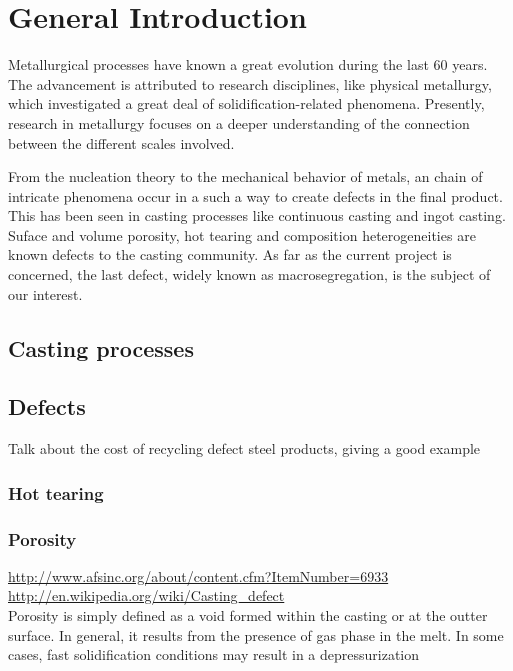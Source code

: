 \chapter*{General Introduction}


Metallurgical processes have known a great evolution during the last 60 years. The advancement is attributed to 
research disciplines, like physical metallurgy, which investigated a great deal of solidification-related phenomena.
Presently, research in metallurgy focuses on a deeper understanding of the connection between the different scales involved.

From the nucleation theory to the mechanical behavior of metals, an chain of intricate phenomena occur in a such a way
to create defects in the final product. This has been seen in casting processes like continuous casting and ingot
casting. Suface and volume porosity, hot tearing and composition heterogeneities are known defects to the casting community.
As far as the current project is concerned, the last defect, widely known as macrosegregation, is the subject of our interest.

\section{Casting processes}

\section*{Defects}
Talk about the cost of recycling defect steel products, giving a good example
\subsection*{Hot tearing}

\subsection*{Porosity}
\url{http://www.afsinc.org/about/content.cfm?ItemNumber=6933} \\
\url{http://en.wikipedia.org/wiki/Casting_defect} \\
Porosity is simply defined as a void formed within the casting or at the outter surface.
In general, it results from the presence of gas phase in the melt. In some cases, fast
solidification conditions may result in a depressurization 

